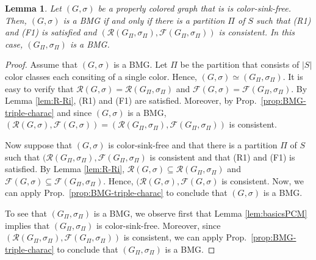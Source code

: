 \documentclass[final,3p,times]{elsarticle}
\newtheorem{lemma}[theorem]{Lemma}%
\begin{document}
\begin{lemma}\label{BMG-R1F1}
    Let $(G,\sigma)$ be a properly colored graph that is  is color-sink-free. 
	Then, $(G,\sigma)$ is a BMG if and only if 
	there is a partition $\Pi$ of $S$ such that (R1) and (F1) is satisfied
	and $(\mathscr{R}(G_\Pi,\sigma_\Pi), \mathscr{F}(G_\Pi,\sigma_\Pi))$
	is consistent. In this case, $(G_\Pi,\sigma_\Pi)$ is a BMG. 
\end{lemma}
\begin{proof}
	Assume that $(G,\sigma)$ is a BMG. Let $\Pi$ be the partition that consists
	of $|S|$ color classes each consiting of a single color. Hence,
	$(G,\sigma)\simeq (G_\Pi,\sigma_\Pi)$. It is easy to verify that
	$\mathscr{R}(G,\sigma) = \mathscr{R}(G_\Pi,\sigma_\Pi)$ and
	$\mathscr{F}(G,\sigma) = \mathscr{F}(G_\Pi,\sigma_\Pi)$. By Lemma
	\ref{lem:R-Ri}, (R1) and (F1) are satisfied. Moreover, by Prop.\
	\ref{prop:BMG-triple-charac} and since $(G,\sigma)$ is a BMG,
	$(\mathscr{R}(G,\sigma), \mathscr{F}(G,\sigma)) =
	(\mathscr{R}(G_\Pi,\sigma_\Pi), \mathscr{F}(G_\Pi,\sigma_\Pi))$ is
	consistent.
	
	Now suppose that $(G,\sigma)$ is color-sink-free and that there is a
	partition $\Pi$ of $S$ such that $(\mathscr{R}(G_\Pi,\sigma_\Pi),
	\mathscr{F}(G_\Pi,\sigma_\Pi)$ is consistent and that (R1) and (F1) is
	satisfied. By Lemma \ref{lem:R-Ri}, $\mathscr{R}(G,\sigma) \subseteq
	\mathscr{R}(G_\Pi,\sigma_\Pi)$ and $\mathscr{F}(G,\sigma) \subseteq
	\mathscr{F}(G_\Pi,\sigma_\Pi)$. Hence, $(\mathscr{R}(G,\sigma)
	,\mathscr{F}(G,\sigma) $ is consistent. Now, we can apply Prop.\
	\ref{prop:BMG-triple-charac} to conclude that $(G,\sigma)$ is a BMG. 
	

	To see that $(G_\Pi,\sigma_\Pi)$ is a BMG, we observe first that Lemma
	\ref{lem:basicsPCM} implies that $(G_\Pi,\sigma_\Pi)$ is color-sink-free.
	Moreover, since $(\mathscr{R}(G_\Pi,\sigma_\Pi),
	\mathscr{F}(G_\Pi,\sigma_\Pi))$ is consistent, we can apply Prop.\
	\ref{prop:BMG-triple-charac} to conclude that $(G_\Pi,\sigma_\Pi)$ is a BMG.
\end{proof}
\end{document}
